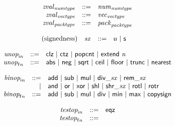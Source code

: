 $$
\begin{array}{@{}lrrl@{}l@{}}
& {{\mathit{zval}}}_{{\mathit{numtype}}} &::=& {{\mathit{num}}}_{{\mathit{numtype}}} \\
& {{\mathit{zval}}}_{{\mathit{vectype}}} &::=& {{\mathit{vec}}}_{{\mathit{vectype}}} \\
& {{\mathit{zval}}}_{{\mathit{packtype}}} &::=& {{\mathit{pack}}}_{{\mathit{packtype}}} \\
\end{array}
$$

\vspace{1ex}

$$
\begin{array}{@{}lrrl@{}l@{}}
\mbox{(signedness)} & {\mathit{sx}} &::=& \mathsf{u} ~|~ \mathsf{s} \\
\end{array}
$$

$$
\begin{array}{@{}lrrl@{}l@{}}
& {{\mathit{unop}}}_{{\mathsf{i}}{{\mathit{n}}}} &::=& \mathsf{clz} ~|~ \mathsf{ctz} ~|~ \mathsf{popcnt} ~|~ \mathsf{extend}~{\mathit{n}} \\
& {{\mathit{unop}}}_{{\mathsf{f}}{{\mathit{n}}}} &::=& \mathsf{abs} ~|~ \mathsf{neg} ~|~ \mathsf{sqrt} ~|~ \mathsf{ceil} ~|~ \mathsf{floor} ~|~ \mathsf{trunc} ~|~ \mathsf{nearest} \\
\end{array}
$$

$$
\begin{array}{@{}lrrl@{}l@{}}
& {{\mathit{binop}}}_{{\mathsf{i}}{{\mathit{n}}}} &::=& \mathsf{add} ~|~ \mathsf{sub} ~|~ \mathsf{mul} ~|~ {\mathsf{div\_}}{{\mathit{sx}}} ~|~ {\mathsf{rem\_}}{{\mathit{sx}}} \\ &&|&
\mathsf{and} ~|~ \mathsf{or} ~|~ \mathsf{xor} ~|~ \mathsf{shl} ~|~ {\mathsf{shr\_}}{{\mathit{sx}}} ~|~ \mathsf{rotl} ~|~ \mathsf{rotr} \\
& {{\mathit{binop}}}_{{\mathsf{f}}{{\mathit{n}}}} &::=& \mathsf{add} ~|~ \mathsf{sub} ~|~ \mathsf{mul} ~|~ \mathsf{div} ~|~ \mathsf{min} ~|~ \mathsf{max} ~|~ \mathsf{copysign} \\
\end{array}
$$

$$
\begin{array}{@{}lrrl@{}l@{}}
& {{\mathit{testop}}}_{{\mathsf{i}}{{\mathit{n}}}} &::=& \mathsf{eqz} \\
& {{\mathit{testop}}}_{{\mathsf{f}}{{\mathit{n}}}} &::=&  \\
\end{array}
$$

